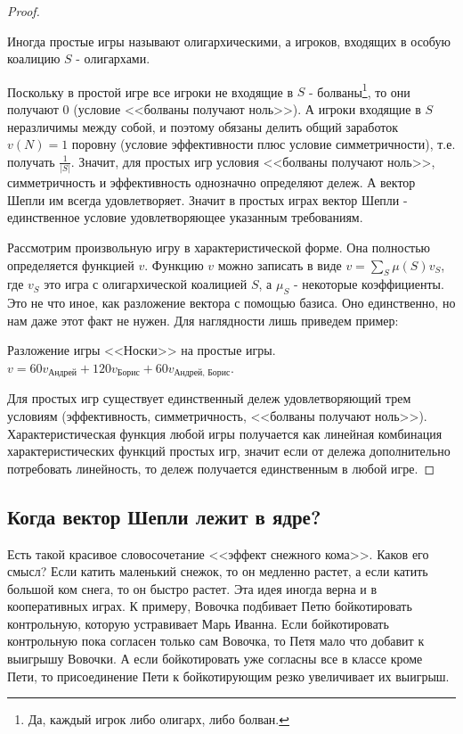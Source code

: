 \begin{proof}
\begin{mydef}
\end{mydef}

Иногда простые игры называют олигархическими, а игроков, входящих в особую коалицию $S$ - олигархами.

Поскольку в простой игре все игроки не входящие в $S$ - болваны\footnote{Да, каждый игрок либо олигарх, либо болван.}, то они получают 0 (условие <<болваны получают ноль>>). А игроки входящие в $S$ неразличимы между собой, и поэтому обязаны делить общий заработок $v(N)=1$ поровну (условие эффективности плюс условие симметричности), т.е. получать $\frac{1}{|S|}$.
Значит, для простых игр условия <<болваны получают ноль>>, симметричность и эффективность однозначно определяют дележ. А вектор Шепли им всегда удовлетворяет. Значит в простых играх вектор Шепли - единственное условие удовлетворяющее указанным требованиям.

Рассмотрим произвольную игру в характеристической форме. Она полностью определяется функцией $v$. Функцию $v$ можно записать в виде $v=\sum_{S}\mu(S)v_{S}$, где $v_{S}$ это игра с олигархической коалицией $S$, а $\mu_{S}$ - некоторые коэффициенты. Это не что иное, как разложение вектора с помощью базиса. Оно единственно, но нам даже этот факт не нужен. Для наглядности лишь приведем пример:

\begin{myex}
Разложение игры <<Носки>> на простые игры. $v=60v_{\mbox{Андрей}}+120v_{\mbox{Борис}}+60v_{\mbox{Андрей, Борис}}$.
\end{myex}


Для простых игр существует единственный дележ удовлетворяющий трем условиям (эффективность, симметричность, <<болваны получают ноль>>). Характеристическая функция любой игры получается как линейная комбинация характеристических функций простых игр, значит если от дележа дополнительно потребовать линейность, то дележ получается единственным в любой игре.
\end{proof}

\subsection{Когда вектор Шепли лежит в ядре?}

Есть такой красивое словосочетание <<эффект снежного кома>>. Каков его смысл? Если катить маленький снежок, то он медленно растет, а если катить большой ком снега, то он быстро растет. Эта идея иногда верна и в кооперативных играх. К примеру, Вовочка подбивает Петю бойкотировать контрольную, которую устравивает Марь Иванна. Если бойкотировать контрольную пока согласен только сам Вовочка, то Петя мало что добавит к выигрышу Вовочки. А если бойкотировать уже согласны все в классе кроме Пети, то присоединение Пети к бойкотирующим резко увеличивает их выигрыш.

